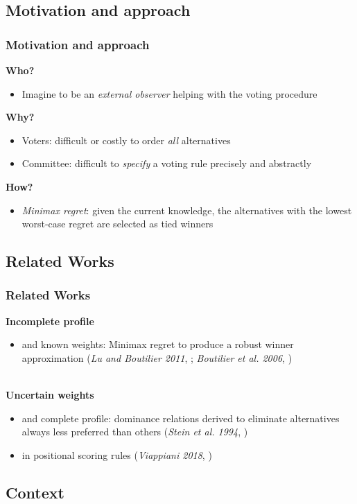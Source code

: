 \documentclass{beamer}
\begin{document}
\subsection{Motivation and approach}
\begin{frame}
	\frametitle{Motivation and approach}
	\textbf{Who?}
	\begin{itemize}
		\item Imagine to be an \emph{external observer} helping with the voting procedure
	\end{itemize}
	 \textbf{Why?}
	\begin{itemize}
		\item Voters: difficult or costly to order \emph{all} alternatives
		\item Committee: difficult to \emph{specify} a voting rule precisely and abstractly
	\end{itemize}
	 \textbf{How?}
	\begin{itemize}
		\item \emph{Minimax regret}: given the current knowledge, the alternatives with the lowest worst-case regret are selected as tied winners
	\end{itemize}		
\end{frame}

\subsection{Related Works}
\begin{frame}
	\frametitle{Related Works}
	\textbf{Incomplete profile}  
	\begin{itemize}
		\item and known weights: Minimax regret to produce a robust winner approximation (\textit{Lu and Boutilier 2011}, \cite{Lu2011}; \textit{Boutilier et al. 2006}, \cite{Boutilier2006})
	\end{itemize}~\\
	\textbf{Uncertain weights} 
	\begin{itemize}
		\item and complete profile: dominance relations derived to eliminate alternatives always less preferred than others (\textit{Stein et al. 1994}, \cite{Stein1994})
		\item in positional scoring rules (\textit{Viappiani 2018}, \cite{Viappiani2018})
	\end{itemize}
\end{frame}

\subsection{Context}
\end{document}
